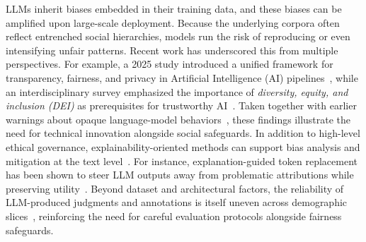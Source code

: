 \documentclass[runningheads]{llncs}
\begin{document}
LLMs inherit biases embedded in their training data, and these biases can be amplified upon large-scale deployment. Because the underlying corpora often reflect entrenched social hierarchies, models run the risk of reproducing or even intensifying unfair patterns. Recent work has underscored this from multiple perspectives. For example, a 2025 study introduced a unified framework for transparency, fairness, and privacy in Artificial Intelligence (AI) pipelines~\cite{Radanliev2025}, while an interdisciplinary survey emphasized the importance of \emph{diversity, equity, and inclusion (DEI)} as prerequisites for trustworthy AI~\cite{cachat2023diversity}. Taken together with earlier warnings about opaque language-model behaviors~\cite{Bender2021}, these findings illustrate the need for technical innovation alongside social safeguards. In addition to high-level ethical governance, explainability-oriented methods can support bias analysis and mitigation at the text level~\cite{mohammadi2025explainability}. For instance, explanation-guided token replacement has been shown to steer LLM outputs away from problematic attributions while preserving utility~\cite{mohammadi2025xtr}. Beyond dataset and architectural factors, the reliability of LLM-produced judgments and annotations is itself uneven across demographic slices~\cite{mohammadi2025reliability}, reinforcing the need for careful evaluation protocols alongside fairness safeguards.
\end{document}
